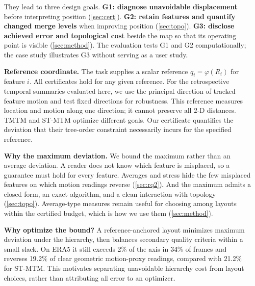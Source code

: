 \documentclass[review]{vgtc}                 %
\begin{document}
They lead to three design goals. \textbf{G1: diagnose unavoidable displacement} before interpreting position (\cref{sec:cert}). \textbf{G2: retain features and quantify changed merge levels} when improving position (\cref{sec:topo}). \textbf{G3: disclose achieved error and topological cost} beside the map so that its operating point is visible (\cref{sec:method}). The evaluation tests G1 and G2 computationally; the case study illustrates G3 without serving as a user study.

\textbf{Reference coordinate.} The task supplies a scalar reference $q_i=\varphi(R_i)$ for feature $i$. All certificates hold for any given reference. For the retrospective temporal summaries evaluated here, we use the principal direction of tracked feature motion and test fixed directions for robustness. This reference measures location and motion along one direction; it cannot preserve all 2-D distances. TMTM and ST-MTM optimize different goals. Our certificate quantifies the deviation that their tree-order constraint necessarily incurs for the specified reference.

\textbf{Why the maximum deviation.} We bound the maximum rather than an average deviation. A reader does not know which feature is misplaced, so a guarantee must hold for every feature. Averages and stress hide the few misplaced features on which motion readings reverse (\cref{sec:rq2}). And the maximum admits a closed form, an exact algorithm, and a clean interaction with topology (\cref{sec:topo}). Average-type measures remain useful for choosing among layouts within the certified budget, which is how we use them (\cref{sec:method}).

\textbf{Why optimize the bound?} A reference-anchored layout minimizes maximum deviation under the hierarchy, then balances secondary quality criteria within a small slack. On ERA5 it still exceeds 2\% of the axis in 34\% of frames and reverses 19.2\% of clear geometric motion-proxy readings, compared with 21.2\% for ST-MTM. This motivates separating unavoidable hierarchy cost from layout choices, rather than attributing all error to an optimizer.
\end{document}
